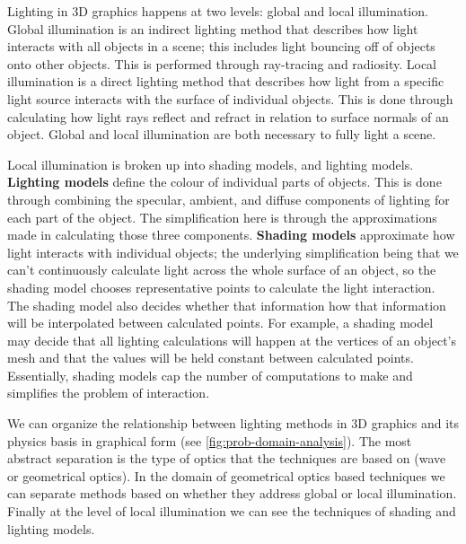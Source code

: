 \documentclass[12pt]{article}
\begin{document}
Lighting in 3D graphics happens at two levels: global and local illumination.  
Global illumination is an indirect lighting method that describes how light 
interacts with all objects in a scene; this includes light bouncing off of 
objects onto other objects. This is performed through ray-tracing and 
radiosity. Local illumination is a direct lighting method that describes how 
light from a specific light source interacts with the surface of individual 
objects. This is done through calculating how light rays reflect and refract in 
relation to surface normals of an object. Global and local illumination are 
both necessary to fully light a scene.

Local illumination is broken up into shading models, and lighting models.  
\textbf{Lighting models} define the colour of individual parts of objects. This 
is done through combining the specular, ambient, and diffuse components of 
lighting for each part of the object. The simplification here is through the 
approximations made in calculating those three components. \textbf{Shading 
models} approximate how light interacts with individual objects; the underlying 
simplification being that we can't continuously calculate light across the 
whole surface of an object, so the shading model chooses representative points 
to calculate the light interaction. The shading model also decides whether that 
information how that information will be interpolated between calculated 
points. For example, a shading model may decide that all lighting calculations 
will happen at the vertices of an object's mesh and that the values will be 
held constant between calculated points. Essentially, shading models cap the 
number of computations to make and simplifies the problem of interaction.

We can organize the relationship between lighting methods in 3D graphics and 
its physics basis in graphical form (see \ref{fig:prob-domain-analysis}). The 
most abstract separation is the type of optics that the techniques are based on 
(wave or geometrical optics). In the domain of geometrical optics based 
techniques we can separate methods based on whether they address global or 
local illumination. Finally at the level of local illumination we can see the 
techniques of shading and lighting models.
\end{document}

